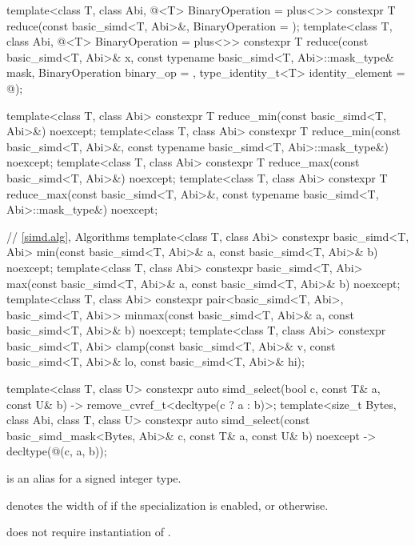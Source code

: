 \begin{codeblock}
{  template<class T, class Abi, @\reductionoperation@<T> BinaryOperation = plus<>>
    constexpr T reduce(const basic_simd<T, Abi>&, BinaryOperation = {});
  template<class T, class Abi, @\reductionoperation@<T> BinaryOperation = plus<>>
    constexpr T reduce(const basic_simd<T, Abi>& x, const typename basic_simd<T, Abi>::mask_type& mask,
                       BinaryOperation binary_op = {}, type_identity_t<T> identity_element = @\seebelow@);

  template<class T, class Abi>
    constexpr T reduce_min(const basic_simd<T, Abi>&) noexcept;
  template<class T, class Abi>
    constexpr T reduce_min(const basic_simd<T, Abi>&,
                           const typename basic_simd<T, Abi>::mask_type&) noexcept;
  template<class T, class Abi>
    constexpr T reduce_max(const basic_simd<T, Abi>&) noexcept;
  template<class T, class Abi>
    constexpr T reduce_max(const basic_simd<T, Abi>&,
                           const typename basic_simd<T, Abi>::mask_type&) noexcept;

  // \ref{simd.alg}, Algorithms
  template<class T, class Abi>
    constexpr basic_simd<T, Abi>
      min(const basic_simd<T, Abi>& a, const basic_simd<T, Abi>& b) noexcept;
  template<class T, class Abi>
    constexpr basic_simd<T, Abi>
      max(const basic_simd<T, Abi>& a, const basic_simd<T, Abi>& b) noexcept;
  template<class T, class Abi>
    constexpr pair<basic_simd<T, Abi>, basic_simd<T, Abi>>
      minmax(const basic_simd<T, Abi>& a, const basic_simd<T, Abi>& b) noexcept;
  template<class T, class Abi>
    constexpr basic_simd<T, Abi>
      clamp(const basic_simd<T, Abi>& v, const basic_simd<T, Abi>& lo,
            const basic_simd<T, Abi>& hi);

  template<class T, class U>
    constexpr auto simd_select(bool c, const T& a, const U& b)
    -> remove_cvref_t<decltype(c ? a : b)>;
  template<size_t Bytes, class Abi, class T, class U>
    constexpr auto simd_select(const basic_simd_mask<Bytes, Abi>& c, const T& a, const U& b)
    noexcept -> decltype(@\simdselect@(c, a, b));
}
\end{codeblock}

\pnum
\simdsizetype{} is an alias for a signed integer type.

\pnum
{} denotes the width of  if
the specialization  is enabled, or  otherwise.
\begin{note}
   does not require instantiation of .
\end{note}

